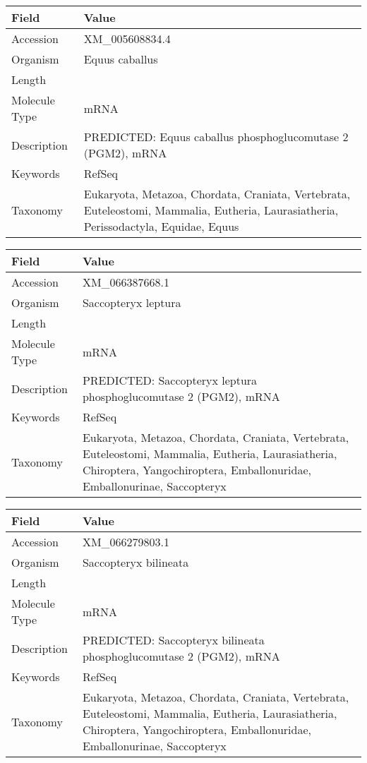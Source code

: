 \documentclass[10pt]{article}
\begin{document}
{\footnotesize
\begin{longtable}{>{\raggedright\arraybackslash}p{4.5cm} >{\raggedright\arraybackslash}p{11.5cm}}
\textbf{Field} & \textbf{Value} \\
\hline
Accession & XM\_005608834.4 \\
Organism & Equus caballus \\
Length & 4403 \\
Molecule Type & mRNA \\
Description & PREDICTED: Equus caballus phosphoglucomutase 2 (PGM2), mRNA \\
Keywords & RefSeq \\
Taxonomy & Eukaryota, Metazoa, Chordata, Craniata, Vertebrata, Euteleostomi, Mammalia, Eutheria, Laurasiatheria, Perissodactyla, Equidae, Equus \\
\end{longtable}
}

{\footnotesize
\begin{longtable}{>{\raggedright\arraybackslash}p{4.5cm} >{\raggedright\arraybackslash}p{11.5cm}}
\textbf{Field} & \textbf{Value} \\
\hline
Accession & XM\_066387668.1 \\
Organism & Saccopteryx leptura \\
Length & 3941 \\
Molecule Type & mRNA \\
Description & PREDICTED: Saccopteryx leptura phosphoglucomutase 2 (PGM2), mRNA \\
Keywords & RefSeq \\
Taxonomy & Eukaryota, Metazoa, Chordata, Craniata, Vertebrata, Euteleostomi, Mammalia, Eutheria, Laurasiatheria, Chiroptera, Yangochiroptera, Emballonuridae, Emballonurinae, Saccopteryx \\
\end{longtable}
}

{\footnotesize
\begin{longtable}{>{\raggedright\arraybackslash}p{4.5cm} >{\raggedright\arraybackslash}p{11.5cm}}
\textbf{Field} & \textbf{Value} \\
\hline
Accession & XM\_066279803.1 \\
Organism & Saccopteryx bilineata \\
Length & 3927 \\
Molecule Type & mRNA \\
Description & PREDICTED: Saccopteryx bilineata phosphoglucomutase 2 (PGM2), mRNA \\
Keywords & RefSeq \\
Taxonomy & Eukaryota, Metazoa, Chordata, Craniata, Vertebrata, Euteleostomi, Mammalia, Eutheria, Laurasiatheria, Chiroptera, Yangochiroptera, Emballonuridae, Emballonurinae, Saccopteryx \\
\end{longtable}
}
\end{document}
